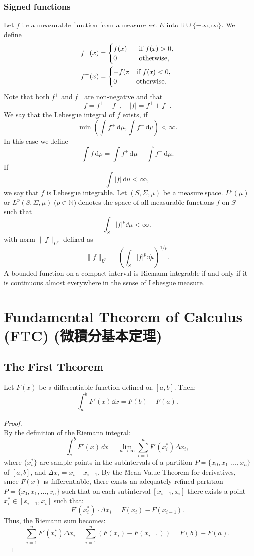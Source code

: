 \documentclass[a4paper,12pt]{report}
\begin{document}
\subsubsection{Signed functions}
Let $f$ be a measurable function from a measure set $E$ into $\mathbb{R}\cup\{-\infty,\infty\}$. We define
\[\begin{aligned}
f^{+}(x)&=
\begin{cases}
f(x)\hphantom{-}&\text{if }f(x)>0,\\
0&\text{otherwise},
\end{cases}\\
f^{-}(x)&=
\begin{cases}
-f(x&{\text{if }}f(x)<0,\\
0&\text{otherwise}.
\end{cases}
\end{aligned}\]
Note that both $f^+$ and $f^-$ are non-negative and that
\[f=f^+-f^-,\quad |f|=f^++f^-.\]
We say that the Lebesgue integral of $f$ exists, if
\[ \min \left(\int f^{+}\,\mathrm{d}\mu ,\int f^{-}\,\mathrm{d}\mu \right)<\infty .\]
In this case we define
\[ \int f\,\mathrm{d}\mu =\int f^{+}\,\mathrm{d}\mu -\int f^{-}\,\mathrm{d}\mu.\]
If
\[\int |f|\,\mathrm {d} \mu <\infty ,\]
we say that $f$ is Lebesgue integrable.
Let $(S,\Sigma,\mu)$ be a measure space. $L^p(\mu)$ or $L^p(S,\Sigma,\mu)$ ($p\in\mathbb{N}$) denotes the space of all measurable functions $f$ on $S$ such that
\[\int_S|f|^p\dd{\mu}<\infty,\]
with norm $\|f\|_{L^p}$ defined as
\[\|f\|_{L^p} = \left(\int_S |f|^p \dd{\mu} \right)^{1/p}.\]
A bounded function on a compact interval is Riemann integrable if and only if it is continuous almost everywhere in the sense of Lebesgue measure.



\section{Fundamental Theorem of Calculus (FTC) (微積分基本定理)}
\subsection{The First Theorem}
Let $F(x)$ be a differentiable function defined on $[a,b]$. Then:
\[\int_a^bF'(x)\dd{x}=F(b)-F(a).\]
\begin{proof}\mbox{}\\
By the definition of the Riemann integral:
\[
\int_a^b F'(x)\, \dd{x} = \lim_{n \to \infty} \sum_{i=1}^n F'(x_i^*) \Delta x_i,
\]
where \( \{x_i^*\} \) are sample points in the subintervals of a partition \( P = \{x_0, x_1, \dots, x_n\} \) of \([a, b]\), and \( \Delta x_i = x_i - x_{i-1} \).
By the Mean Value Theorem for derivatives, since \( F(x) \) is differentiable, there exists an adequately refined partition \( P = \{x_0, x_1, \dots, x_n\} \) such that on each subinterval \([x_{i-1}, x_i]\) there exists a point \( x_i^* \in [x_{i-1}, x_i] \) such that:
\[
F'(x_i^*) \cdot \Delta x_i = F(x_i) - F(x_{i-1}).
\]
Thus, the Riemann sum becomes:
\[
\sum_{i=1}^n F'(x_i^*) \Delta x_i = \sum_{i=1}^n \left(F(x_i) - F(x_{i-1})\right) = F(b) - F(a).
\]
\end{proof}
\end{document}
